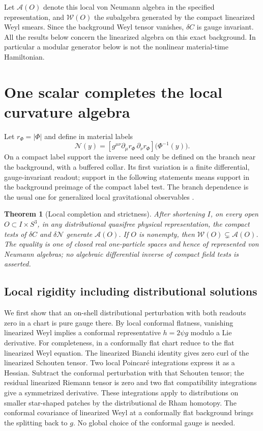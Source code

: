 \documentclass[11pt]{article}
\newtheorem{theorem}{Theorem}[section]
\begin{document}
Let \(\mathcal A(O)\) denote this local von Neumann algebra in the specified representation, and \(\mathcal W(O)\) the subalgebra generated by the compact linearized Weyl smears. Since the background Weyl tensor vanishes, \(\delta C\) is gauge invariant. All the results below concern the linearized algebra on this exact background. In particular a modular generator below is not the nonlinear material-time Hamiltonian.

\section{One scalar completes the local curvature algebra}

Let \(r_\Phi=|\Phi|\) and define in material labels
\begin{equation}
 \mathcal N(y)=
 \left[g^{\mu\nu}\partial_\mu r_\Phi\,\partial_\nu r_\Phi\right]
       \bigl(\Phi^{-1}(y)\bigr).
 \label{eq:N}
\end{equation}
On a compact label support the inverse need only be defined on the branch near the background, with a buffered collar. Its first variation is a finite differential, gauge-invariant readout; support in the following statements means support in the background preimage of the compact label test. The branch dependence is the usual one for generalized local gravitational observables \cite{khavlocal}.

\begin{theorem}[Local completion and strictness]\label{thm:completion}
After shortening \(I\), on every open \(O\subset I\times S^3\), in any distributional quasifree physical representation, the compact tests of \(\delta C\) and \(\delta\mathcal N\) generate \(\mathcal A(O)\). If \(O\) is nonempty, then \(\mathcal W(O)\subsetneq\mathcal A(O)\). The equality is one of closed real one-particle spaces and hence of represented von Neumann algebras; no algebraic differential inverse of compact field tests is asserted.
\end{theorem}

\subsection{Local rigidity including distributional solutions}

We first show that an on-shell distributional perturbation with both readouts zero in a chart is pure gauge there. By local conformal flatness, vanishing linearized Weyl implies a conformal representative \(h=2\psi g\) modulo a Lie derivative. For completeness, in a conformally flat chart reduce to the flat linearized Weyl equation. The linearized Bianchi identity gives zero curl of the linearized Schouten tensor. Two local Poincar\'e integrations express it as a Hessian. Subtract the conformal perturbation with that Schouten tensor; the residual linearized Riemann tensor is zero and two flat compatibility integrations give a symmetrized derivative. These integrations apply to distributions on smaller star-shaped patches by the distributional de Rham homotopy. The conformal covariance of linearized Weyl at a conformally flat background brings the splitting back to \(g\). No global choice of the conformal gauge is needed.
\end{document}
